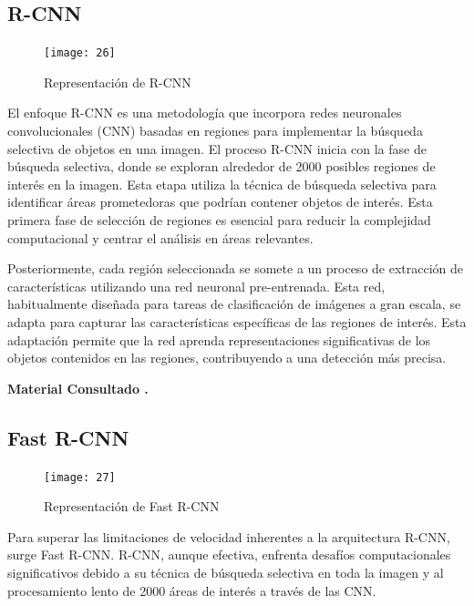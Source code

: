	\subsection{R-CNN}
	
	\begin{figure} 
		\centering
		\texttt{[image: 26]}
		\caption{Representación de R-CNN}
	\end{figure}

	El enfoque R-CNN es una metodología que incorpora redes neuronales convolucionales (CNN) basadas en regiones para implementar la búsqueda selectiva de objetos en una imagen.
El proceso R-CNN inicia con la fase de búsqueda selectiva, donde se exploran alrededor de 2000 posibles regiones de interés en la imagen. Esta etapa utiliza la técnica de búsqueda selectiva para identificar áreas prometedoras que podrían contener objetos de interés. Esta primera fase de selección de regiones es esencial para reducir la complejidad computacional y centrar el análisis en áreas relevantes.

	Posteriormente, cada región seleccionada se somete a un proceso de extracción de características utilizando una red neuronal pre-entrenada. Esta red, habitualmente diseñada para tareas de clasificación de imágenes a gran escala, se adapta para capturar las características específicas de las regiones de interés. Esta adaptación permite que la red aprenda representaciones significativas de los objetos contenidos en las regiones, contribuyendo a una detección más precisa.


     \begin{flushright}
        \textbf{Material Consultado \cite{filminasleo}.}
    \end{flushright}

	\subsection{Fast R-CNN}

	\begin{figure} 
	    \centering
		\texttt{[image: 27]}
		\caption{Representación de Fast R-CNN}
	\end{figure}
 
	Para superar las limitaciones de velocidad inherentes a la arquitectura R-CNN, surge Fast R-CNN. R-CNN, aunque efectiva, enfrenta desafíos computacionales significativos debido a su técnica de búsqueda selectiva en toda la imagen y al procesamiento lento de 2000 áreas de interés a través de las CNN.
 
